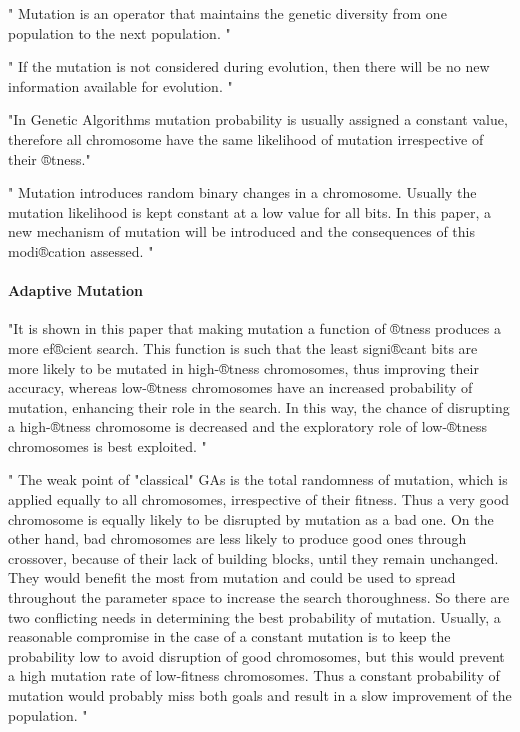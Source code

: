 "
Mutation is an operator that maintains the genetic diversity from one population to the next population.
"\cite{katoch_review_2021}

"
If the mutation is not considered during evolution, then there will be no new information available for evolution.
"\cite{katoch_review_2021}

"In Genetic Algorithms mutation probability is usually assigned a constant value, therefore all chromosome have the same likelihood of mutation irrespective of their ®tness."\cite{marsili_libelli_adaptive_2000}

"
Mutation introduces random binary changes in a chromosome. Usually the mutation likelihood is kept constant at a low value for all bits. In this paper, a new mechanism of mutation will be introduced and the consequences of this modi®cation assessed.
"\cite{marsili_libelli_adaptive_2000}
\paragraph{Adaptive Mutation}
"It is shown in this paper that making mutation a function of ®tness produces a more ef®cient search. This function is such that the least signi®cant bits are more likely to be mutated in high-®tness chromosomes, thus improving their accuracy, whereas low-®tness chromosomes have an increased probability of mutation, enhancing their role in the search. In this way, the chance of disrupting a high-®tness chromosome is decreased and the exploratory role of low-®tness chromosomes is best exploited.
"
\cite{marsili_libelli_adaptive_2000}

"
The weak point of "classical" GAs is the total randomness of mutation, which is applied equally to all chromosomes, irrespective of their fitness. Thus a very good chromosome is equally likely to be disrupted by mutation as a bad one. On the other hand, bad chromosomes are less likely to produce good ones through crossover, because of their lack of building blocks, until they remain unchanged. They would benefit the most from mutation and could be used to spread throughout the parameter space to increase the search thoroughness. So there are two conflicting needs in determining the best probability of mutation. Usually, a reasonable compromise in the case of a constant mutation is to keep the probability low to avoid disruption of good chromosomes, but this would prevent a high mutation rate of low-fitness chromosomes. Thus a constant probability of mutation would probably miss both goals and result in a slow improvement of the population.
"\cite{marsili_libelli_adaptive_2000}


